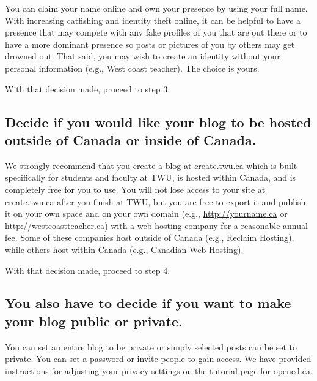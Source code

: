 \documentclass[
]{book}
\begin{document}
You can claim your name online and own your presence by using your full name. With increasing catfishing and identity theft online, it can be helpful to have a presence that may compete with any fake profiles of you that are out there or to have a more dominant presence so posts or pictures of you by others may get drowned out. That said, you may wish to create an identity without your personal information (e.g., West coast teacher). The choice is yours.

With that decision made, proceed to step 3.

\hypertarget{decide-if-you-would-like-your-blog-to-be-hosted-outside-of-canada-or-inside-of-canada.}{%
\subsection*{Decide if you would like your blog to be hosted outside of Canada or inside of Canada.}\label{decide-if-you-would-like-your-blog-to-be-hosted-outside-of-canada-or-inside-of-canada.}}

We strongly recommend that you create a blog at \href{https://create.twu.ca}{create.twu.ca} which is built specifically for students and faculty at TWU, is hosted within Canada, and is completely free for you to use. You will not lose access to your site at create.twu.ca after you finish at TWU, but you are free to export it and publish it on your own space and on your own domain (e.g., \url{http://yourname.ca} or \url{http://westcoastteacher.ca}) with a web hosting company for a reasonable annual fee. Some of these companies host outside of Canada (e.g., Reclaim Hosting), while others host within Canada (e.g., Canadian Web Hosting).

With that decision made, proceed to step 4.

\hypertarget{you-also-have-to-decide-if-you-want-to-make-your-blog-public-or-private.}{%
\subsection*{You also have to decide if you want to make your blog public or private.}\label{you-also-have-to-decide-if-you-want-to-make-your-blog-public-or-private.}}

You can set an entire blog to be private or simply selected posts can be set to private. You can set a password or invite people to gain access. We have provided instructions for adjusting your privacy settings on the tutorial page for opened.ca.
\end{document}
